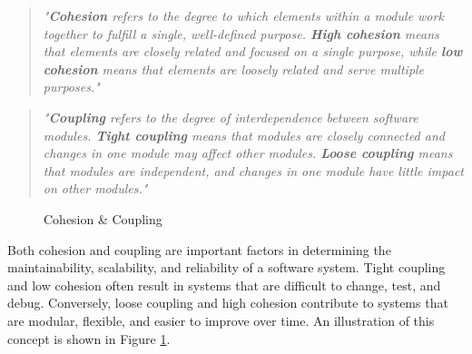 \begin{quote}
\textit{"\textbf{Cohesion} refers to the degree to which elements within a module work together to fulfill a single, well-defined purpose. \textbf{High cohesion} means that elements are closely related and focused on a single purpose, while \textbf{low cohesion} means that elements are loosely related and serve multiple purposes."} \cite{geeksforgeeks:c&c} \\
\end{quote}

\begin{quote}
\textit{"\textbf{Coupling} refers to the degree of interdependence between software modules. \textbf{Tight coupling} means that modules are closely connected and changes in one module may affect other modules. \textbf{Loose coupling} means that modules are independent, and changes in one module have little impact on other modules."} \cite{geeksforgeeks:c&c} \\
\end{quote}

\begin{figure}[h!]
    \centering

    \caption[Cohesion \& Coupling]{Cohesion \& Coupling \cite{geeksforgeeks:c&c}}
    \label{fig:cohesion-coupling}
\end{figure}

Both cohesion and coupling are important factors in determining the maintainability, scalability, and reliability of a software system. Tight coupling and low cohesion often result in systems that are difficult to change, test, and debug. Conversely, loose coupling and high cohesion contribute to systems that are modular, flexible, and easier to improve over time. An illustration of this concept is shown in Figure \ref{fig:cohesion-coupling}. \cite{geeksforgeeks:c&c}

